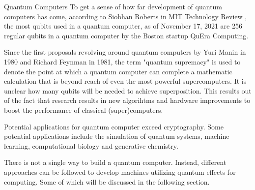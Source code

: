 \documentclass[aps,preprintnumbers,twocolumn]{revtex4}
\begin{document}
\begin{section}{Quantum Computers}
To get a sense of how far development of quantum computers has come, 
according to Siobhan Roberts in MIT Technology Review \cite{MIT}, 
the most qubits used in a quantum computer, 
as of November 17, 2021 are 256 regular qubits in a quantum computer by the Boston startup QuEra Computing. 

Since the first proposals revolving around quantum computers by Yuri Manin in 1980 and Richard Feynman in 1981,
the term "quantum supremacy" is used to denote the point at which a quantum computer can complete a mathematic calculation that is beyond reach of even the most powerful supercomputers.
It is unclear how many qubits will be needed to achieve superposition. 
This results out of the fact that research results in new algorihtms and hardware improvements to boost the performance of classical (super)computers. 

Potential applications for quantum computer exceed cryptography. Some potential applications include the simulation of quantum systems, machine learning, computational biology and generative chemistry. 

There is not a single way to build a quantum computer. 
Instead, different approaches can be followed to develop machines utilizing quantum effects for computing. Some of which will be discussed in the following section.
\end{section}
\end{document}

